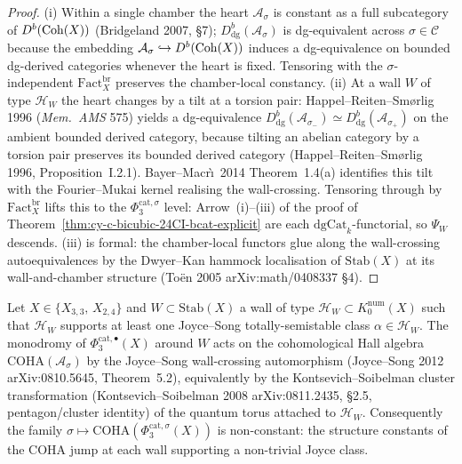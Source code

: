 \begin{proof}
(i) Within a single chamber the heart $\mathcal A_\sigma$ is constant
as a full subcategory of $D^b(\mathrm{Coh}(X))$ (Bridgeland 2007, \S 7);
$D^b_{\mathrm{dg}}(\mathcal A_\sigma)$ is dg-equivalent across
$\sigma \in \mathcal C$ because the embedding
$\mathcal A_\sigma \hookrightarrow D^b(\mathrm{Coh}(X))$ induces a
dg-equivalence on bounded dg-derived categories whenever the heart is
fixed. Tensoring with the $\sigma$-independent
$\mathrm{Fact}^{\mathrm{br}}_X$ preserves the chamber-local constancy.
(ii) At a wall $W$ of type $\mathcal H_W$ the heart changes by a tilt
at a torsion pair: Happel--Reiten--Sm\o{}rlig 1996 (\emph{Mem.\ AMS}
575) yields a dg-equivalence
$D^b_{\mathrm{dg}}(\mathcal A_{\sigma_-}) \simeq
 D^b_{\mathrm{dg}}(\mathcal A_{\sigma_+})$ on the ambient bounded
derived category, because tilting an abelian category by a torsion
pair preserves its bounded derived category (Happel--Reiten--Sm\o{}rlig
1996, Proposition~I.2.1). Bayer--Macr\`\i\ 2014 Theorem~1.4(a)
identifies this tilt with the Fourier--Mukai kernel
realising the wall-crossing. Tensoring through by
$\mathrm{Fact}^{\mathrm{br}}_X$ lifts this to the
$\Phi_3^{\mathrm{cat},\sigma}$ level: Arrow~(i)--(iii) of the proof of
Theorem~\ref{thm:cy-c-bicubic-24CI-bcat-explicit} are each
$\mathrm{dgCat}_k$-functorial, so $\Psi_W$ descends. (iii) is formal:
the chamber-local functors glue along the wall-crossing
autoequivalences by the Dwyer--Kan hammock localisation of
$\mathrm{Stab}(X)$ at its wall-and-chamber structure (To\"en 2005
arXiv:math/0408337 \S 4).
\end{proof}

\begin{proposition}
\label{prop:cy-c-bicubic-24CI-phi-three-cat-sigma-not-constant}
Let $X \in \{X_{3,3},\, X_{2,4}\}$ and
$W \subset \mathrm{Stab}(X)$ a wall of type
$\mathcal H_W \subset K_0^{\mathrm{num}}(X)$ such that $\mathcal H_W$
supports at least one Joyce--Song totally-semistable class
$\alpha \in \mathcal H_W$. The monodromy of
$\Phi_3^{\mathrm{cat},\bullet}(X)$ around $W$ acts on the
cohomological Hall algebra $\mathrm{COHA}(\mathcal A_\sigma)$ by the
Joyce--Song wall-crossing automorphism
(Joyce--Song 2012 arXiv:0810.5645, Theorem~5.2), equivalently by the
Kontsevich--Soibelman cluster transformation
(Kontsevich--Soibelman 2008 arXiv:0811.2435, \S 2.5, pentagon/cluster
identity) of the quantum torus attached to $\mathcal H_W$.
Consequently the family
$\sigma \mapsto \mathrm{COHA}(\Phi_3^{\mathrm{cat},\sigma}(X))$ is
non-constant: the structure constants of the COHA jump at each wall
supporting a non-trivial Joyce class.
\end{proposition}

